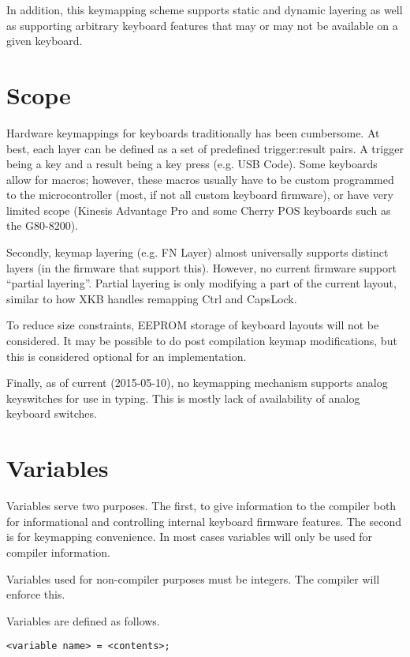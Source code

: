 \documentclass{kiibohd-template}
\begin{document}
In addition, this keymapping scheme supports static and dynamic layering as well as supporting arbitrary keyboard features that may or may not be available on a given keyboard.


\chapter{Scope}

Hardware keymappings for keyboards traditionally has been cumbersome.
At best, each layer can be defined as a set of predefined trigger:result pairs.
A trigger being a key and a result being a key press (e.g. USB Code).
Some keyboards allow for macros; however, these macros usually have to be custom programmed to the microcontroller (most, if not all custom keyboard firmware), or have very limited scope (Kinesis Advantage Pro and some Cherry POS keyboards such as the G80-8200).

Secondly, keymap layering (e.g. FN Layer) almost universally supports distinct layers (in the firmware that support this).
However, no current firmware support ``partial layering''.
Partial layering is only modifying a part of the current layout, similar to how XKB handles remapping Ctrl and CapsLock.

To reduce size constraints, EEPROM storage of keyboard layouts will not be considered.
It may be possible to do post compilation keymap modifications, but this is considered optional for an implementation.

Finally, as of current (2015-05-10), no keymapping mechanism supports analog keyswitches for use in typing.
This is mostly lack of availability of analog keyboard switches.


\chapter{Variables}

Variables serve two purposes.
The first, to give information to the compiler both for informational and controlling internal keyboard firmware features.
The second is for keymapping convenience.
In most cases variables will only be used for compiler information.

Variables used for non-compiler purposes must be integers.
The compiler will enforce this.

Variables are defined as follows.

\begin{lstlisting}
<variable name> = <contents>;
\end{lstlisting}
\end{document}
